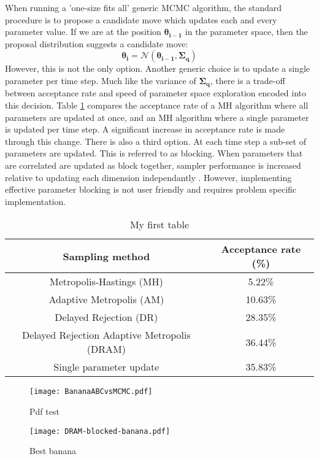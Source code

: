 When running a 'one-size fits all' generic MCMC algorithm, the standard procedure is to propose a candidate move which updates each and every parameter value. If we are at the position $\bm{\theta_{i-1}}$ in the parameter space, then the proposal distribution suggests a candidate move:
\begin{equation}
	\bm{\theta_{i}} = \mathcal{N}(\bm{\theta_{i-1}},\bm{\Sigma_q})
\end{equation}
However, this is not the only option. Another generic choice is to update a single parameter per time step. Much like the variance of $\bm{\Sigma_q}$, there is a trade-off between acceptance rate and speed of parameter space exploration encoded into this decision. Table \ref{sampling-method-comparison} compares the acceptance rate of a MH algorithm where all parameters are updated at once, and an MH algorithm where a single parameter is updated per time step. A significant increase in acceptance rate is made through this change. There is also a third option. At each time step a sub-set of parameters are updated. This is referred to as blocking. When parameters that are correlated are updated as block together, sampler performance is increased relative to updating each dimension independantly \citep{Turek2017}. However, implementing effective parameter blocking is not user friendly and requires problem specific implementation. 

\begin{table}[H]
	\centering
	\begin{tabular}{|c|c|}
	\hline
	Sampling method & Acceptance rate (\%) \\
	\hline
	Metropolis-Hastings (MH) & 5.22\% \\
	\hline
	Adaptive Metropolis (AM) & 10.63\% \\
	\hline
	Delayed Rejection (DR) & 28.35\% \\
	\hline
	Delayed Rejection Adaptive Metropolis (DRAM) & 36.44\% \\
	\hline
	Single parameter update & 35.83\% \\
	\hline
	\end{tabular}
	\caption{My first table}
	\label{sampling-method-comparison}
\end{table}



\begin{figure}[H]
\centering
\texttt{[image: BananaABCvsMCMC.pdf]}
\caption{Pdf test}
\end{figure}

\begin{figure}[H]
\centering
\texttt{[image: DRAM-blocked-banana.pdf]}
\caption{Best banana}
\end{figure}
